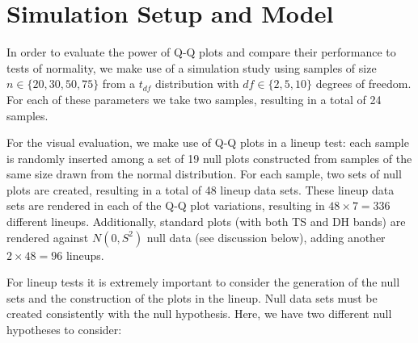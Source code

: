 \documentclass[12pt]{article}\usepackage[]{graphicx}\usepackage[]{color}
\newcommand{\alnote}[1]{\todo[inline,color=green!40]{#1}}
\begin{document}

\section{Simulation Setup and Model}\label{sec:simu}

In order to evaluate the power of Q-Q plots and compare their performance to tests of normality, we make use of a simulation study 
using samples of size $n \in \{20, 30, 50, 75\}$ from a $t_{df}$ distribution with $df \in \{2, 5, 10\}$ degrees of freedom. For each of these parameters we take two samples, resulting in a total of 24 samples.

For the visual evaluation, we make use of Q-Q plots in a lineup test: each sample is randomly inserted among a set of 19 null plots constructed from samples of the same size drawn from the normal distribution. For each  sample, two sets of null plots are created, resulting in a total of 48 lineup data sets. 
These lineup data sets are rendered in each of the Q-Q plot variations, resulting in $48 \times 7 = 336$ different lineups.  Additionally, standard plots (with both TS and DH bands) are rendered against $N(0, S^2)$ null data (see discussion below), adding another $2 \times 48 = 96$ lineups.




For lineup tests it is extremely important to consider the generation of the null sets and the construction of the plots in the lineup. 
Null data sets must be created consistently with the null hypothesis. Here, we have two different null hypotheses to consider:
\end{document}
